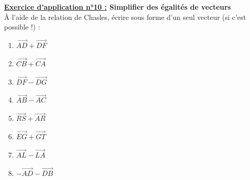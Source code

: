 \documentclass[12pt]{article}
\begin{document}
\begin{mdframed}[
    linewidth=1pt,
    roundcorner=5pt,
    linecolor=RoyalBlue,
    innertopmargin=10pt,
    innerbottommargin=10pt
]
\begin{minipage}[t]{.45\textwidth}

\end{minipage}%

\vspace{20pt}

{\color{RoyalBlue}\textbf{\underline{Exercice d'application n°10 :} Simplifier des égalités de vecteurs}
\vspace{5pt}
}
\\À l'aide de la relation de Chasles, écrire sous forme d'un seul vecteur (si c'est possible !) :
\\
\begin{minipage}[t]{.25\textwidth}%
    \begin{enumerate}
        \item $\overrightarrow{AD} + \overrightarrow{DF}$
        \item $\overrightarrow{CB} + \overrightarrow{CA}$
        \item $\overrightarrow{DF} - \overrightarrow{DG}$
        \item $\overrightarrow{AB} - \overrightarrow{AC}$
    \end{enumerate}
\end{minipage}%
\hfill
\begin{minipage}[t]{.75\textwidth}%
    \begin{enumerate}
        \setcounter{enumi}{4}
        \item $\overrightarrow{RS} + \overrightarrow{AR}$
        \item $\overrightarrow{EG} + \overrightarrow{GT}$
        \item $\overrightarrow{AL} - \overrightarrow{LA}$
        \item $- \overrightarrow{AD} - \overrightarrow{DB}$
    \end{enumerate}
\end{minipage}%
\end{mdframed}
\end{document}
